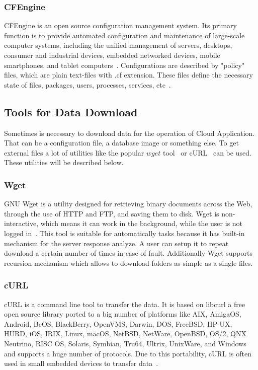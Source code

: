 \subsubsection*{CFEngine}
CFEngine is an open source configuration management system.
Its primary function is to provide automated configuration and maintenance of large-scale computer systems, including the unified management of servers, desktops, consumer and industrial devices, embedded networked devices, mobile smartphones, and tablet computers~\cite{cfengine}.
Configurations are described by "policy" files, which are plain text-files with .cf extension.
These files define the necessary state of files, packages, users, processes, services, etc~\cite{cfengine2}.

\subsection{Tools for Data Download}\label{sec:datadown}
Sometimes is necessary to download data for the operation of Cloud Application.
That can be a configuration file, a database image or something else.
To get external files a lot of utilities like the popular $wget$ tool~\cite{wgetstat,wget} or cURL~\cite{curl} can be used. 
These utilities will be described below.
\subsubsection*{Wget}
GNU Wget is a utility designed for retrieving binary documents across the Web, through the use of HTTP and FTP, and saving them to disk.
Wget is non-interactive, which means it can work in the background, while the user is not logged in~\cite{wget_desc}.
This tool is suitable for automatically  tasks because it has built-in mechanism for the server response analyze.
A user can setup it to repeat download a certain number of times in case of fault.
Additionally Wget supports recursion mechanism which allows to download folders as simple as a single files.
\subsubsection*{cURL}
cURL is a command line tool to transfer the data. It is based on libcurl a free open source library ported to a big number of platforms like AIX, AmigaOS, Android, BeOS, BlackBerry, OpenVMS, Darwin, DOS, FreeBSD, HP-UX, HURD, iOS, IRIX, Linux, macOS, NetBSD, NetWare, OpenBSD, OS/2, QNX Neutrino, RISC OS, Solaris, Symbian, Tru64, Ultrix, UnixWare, and Windows and supports a huge number of protocols.
Due to this portability, cURL is often used in small embedded devices to transfer data~\cite{curl}.